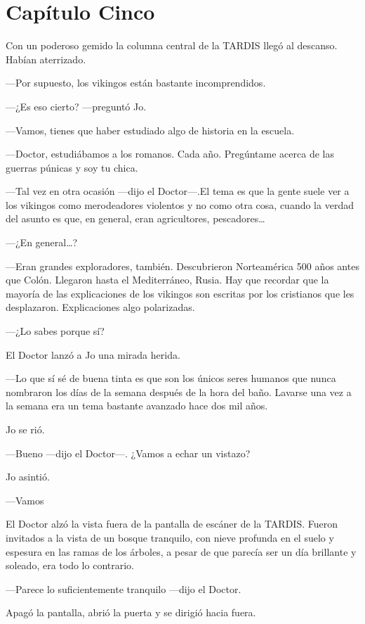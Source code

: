 \chapter*{Capítulo Cinco}

Con un poderoso gemido la columna central de la TARDIS llegó al
descanso. Habían aterrizado.

---Por supuesto, los vikingos están bastante incomprendidos.

---¿Es eso cierto? ---preguntó Jo.

---Vamos, tienes que haber estudiado algo de historia en la escuela.

---Doctor, estudiábamos a los romanos. Cada año. Pregúntame acerca de
las guerras púnicas y soy tu chica.

---Tal vez en otra ocasión ---dijo el Doctor---.El tema es que la gente
suele ver a los vikingos como merodeadores violentos y no como otra
cosa, cuando la verdad del asunto es que, en general, eran agricultores,
pescadores\ldots{}

---¿En general\ldots{}?

---Eran grandes exploradores, también. Descubrieron Norteamérica 500
años antes que Colón. Llegaron hasta el Mediterráneo, Rusia. Hay que
recordar que la mayoría de las explicaciones de los vikingos son
escritas por los cristianos que les desplazaron. Explicaciones algo
polarizadas.

---¿Lo sabes porque sí?

El Doctor lanzó a Jo una mirada herida.

---Lo que sí sé de buena tinta es que son los únicos seres humanos que
nunca nombraron los días de la semana después de la hora del baño.
Lavarse una vez a la semana era un tema bastante avanzado hace dos mil
años.

Jo se rió.

---Bueno ---dijo el Doctor---. ¿Vamos a echar un vistazo?

Jo asintió.

---Vamos

El Doctor alzó la vista fuera de la pantalla de escáner de la TARDIS.
Fueron invitados a la vista de un bosque tranquilo, con nieve profunda
en el suelo y espesura en las ramas de los árboles, a pesar de que
parecía ser un día brillante y soleado, era todo lo contrario.

---Parece lo suficientemente tranquilo ---dijo el Doctor.

Apagó la pantalla, abrió la puerta y se dirigió hacia fuera.

